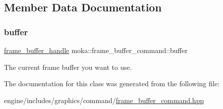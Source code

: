 \subsection{Member Data Documentation}
\mbox{\label{classmoka_1_1frame__buffer__command_a914e3a4d2d80c5005f71706bb800bec6}} 
\subsubsection{\texorpdfstring{buffer}{buffer}}
{\footnotesize\ttfamily \mbox{\hyperlink{structmoka_1_1frame__buffer__handle}{frame\+\_\+buffer\+\_\+handle}} moka\+::frame\+\_\+buffer\+\_\+command\+::buffer}

The current frame buffer you want to use. 

The documentation for this class was generated from the following file\+:\begin{DoxyCompactItemize}
\item 
engine/includes/graphics/command/\mbox{\hyperlink{frame__buffer__command_8hpp}{frame\+\_\+buffer\+\_\+command.\+hpp}}\end{DoxyCompactItemize}
